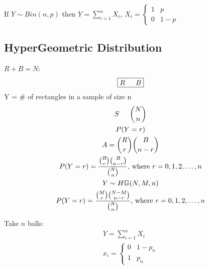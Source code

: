 \documentclass{article}
\begin{document}
If $Y \sim Bin(n,p)$ then $Y = \sum_{i=1}^{n}X_i$,
$
    X_i = \begin{cases}
        1 & p   \\
        0 & 1-p
    \end{cases}
$

\subsection{HyperGeometric Distribution}
$R + B = N$:
\[
    \boxed{R \text{\indent } B}
\]
Y = \# of rectangles in a sample of size n
\begin{gather*}
    S \text{\indent } \binom{N}{n} \\
    P(Y=r) \\
    A = \binom{R}{r}\binom{B}{n-r} \\
    P(Y=r) = \frac{\binom{R}{r}\binom{B}{n-r}}{\binom{N}{n}} \text{, where } r = 0,1,2,\dots , n \\
    Y \sim H \mathbb{G}(N,M,n) \\
    P(Y=r) = \frac{\binom{M}{r}\binom{N-M}{n-r}}{\binom{N}{n}} \text{, where }
    r = 0,1,2, \dots , n
\end{gather*}

Take $n$ balls:
\begin{gather*}
    Y = \sum_{i=1}^{n} X_i \\
    x_i = \begin{cases}
        0 & 1-p_n \\
        1 & p_n
    \end{cases}
\end{gather*}
\end{document}
